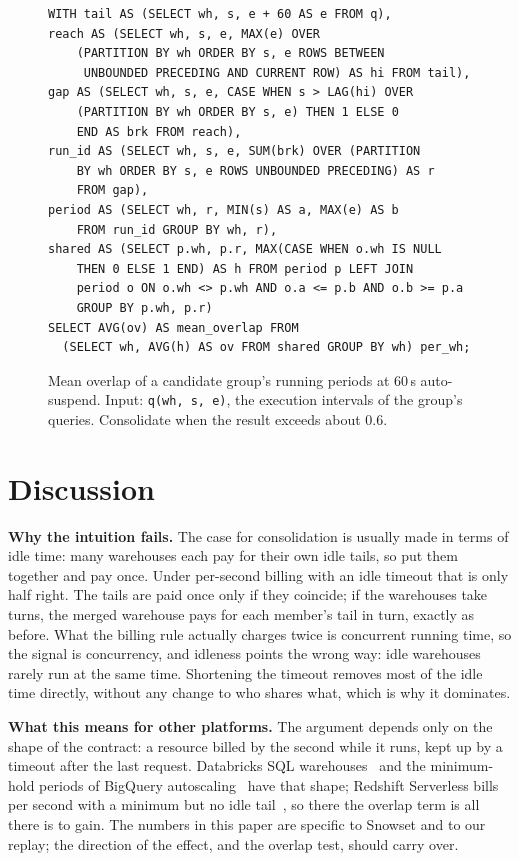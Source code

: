 \documentclass[conference]{IEEEtran}
\begin{document}
\begin{figure}[t]
\begin{lstlisting}
WITH tail AS (SELECT wh, s, e + 60 AS e FROM q),
reach AS (SELECT wh, s, e, MAX(e) OVER
    (PARTITION BY wh ORDER BY s, e ROWS BETWEEN
     UNBOUNDED PRECEDING AND CURRENT ROW) AS hi FROM tail),
gap AS (SELECT wh, s, e, CASE WHEN s > LAG(hi) OVER
    (PARTITION BY wh ORDER BY s, e) THEN 1 ELSE 0
    END AS brk FROM reach),
run_id AS (SELECT wh, s, e, SUM(brk) OVER (PARTITION
    BY wh ORDER BY s, e ROWS UNBOUNDED PRECEDING) AS r
    FROM gap),
period AS (SELECT wh, r, MIN(s) AS a, MAX(e) AS b
    FROM run_id GROUP BY wh, r),
shared AS (SELECT p.wh, p.r, MAX(CASE WHEN o.wh IS NULL
    THEN 0 ELSE 1 END) AS h FROM period p LEFT JOIN
    period o ON o.wh <> p.wh AND o.a <= p.b AND o.b >= p.a
    GROUP BY p.wh, p.r)
SELECT AVG(ov) AS mean_overlap FROM
  (SELECT wh, AVG(h) AS ov FROM shared GROUP BY wh) per_wh;
\end{lstlisting}
\caption{Mean overlap of a candidate group's running periods at 60\,s auto-suspend. Input: \texttt{q(wh, s, e)}, the
execution intervals of the group's queries. Consolidate when the result exceeds about 0.6.}\label{lst:overlap}
\end{figure}

\section{Discussion}
\textbf{Why the intuition fails.} The case for consolidation is usually made in terms of idle time: many warehouses each
pay for their own idle tails, so put them together and pay once. Under per-second billing with an idle timeout that is
only half right. The tails are paid once only if they coincide; if the warehouses take turns, the merged warehouse pays
for each member's tail in turn, exactly as before. What the billing rule actually charges twice is concurrent running
time, so the signal is concurrency, and idleness points the wrong way: idle warehouses rarely run at the same time.
Shortening the timeout removes most of the idle time directly, without any change to who shares what, which is why it
dominates.

\textbf{What this means for other platforms.} The argument depends only on the shape of the contract: a resource billed by
the second while it runs, kept up by a timeout after the last request. Databricks SQL warehouses~\cite{dbx-warehouse} and
the minimum-hold periods of BigQuery autoscaling~\cite{bq-autoscale} have that shape; Redshift Serverless bills per second
with a minimum but no idle tail~\cite{rs-serverless}, so there the overlap term is all there is to gain. The numbers in
this paper are specific to Snowset and to our replay; the direction of the effect, and the overlap test, should carry over.
\end{document}
